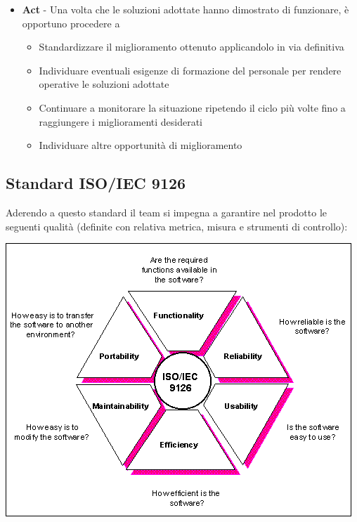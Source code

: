 {\begin{itemize}
  \item  \textbf{Act} - Una volta che le soluzioni adottate hanno dimostrato di funzionare, è opportuno procedere a
  \begin{itemize}
    \item Standardizzare il miglioramento ottenuto applicandolo in via definitiva
    \item Individuare eventuali esigenze di formazione del personale per rendere operative le soluzioni adottate
    \item Continuare a monitorare la situazione ripetendo il ciclo più volte fino a raggiungere i miglioramenti desiderati
    \item Individuare altre opportunità di miglioramento
  \end{itemize}
\end{itemize}

\subsection{Standard ISO/IEC 9126}

Aderendo a questo standard il team si impegna a garantire nel prodotto
le seguenti qualità (definite con relativa metrica, misura e
strumenti di controllo): \\




  \begin{center}
   \includegraphics[scale=0.5]{img/9126s.png}
\end{center}




}
